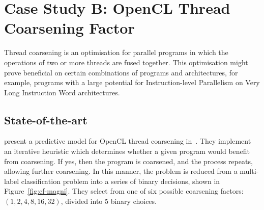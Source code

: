 \section{Case Study B: OpenCL Thread Coarsening Factor}
\label{sec:deeptune-case-study-b}

Thread coarsening is an optimisation for parallel programs in which the operations of two or more threads are fused together. This optimisation might prove beneficial on certain combinations of programs and architectures, for example, programs with a large potential for Instruction-level Parallelism on Very Long Instruction Word architectures.

\subsection{State-of-the-art} \citeauthor{Magni2014} present a predictive model for OpenCL thread coarsening in~\cite{Magni2014}. They implement an iterative heuristic which determines whether a given program would benefit from coarsening. If yes, then the program is coarsened, and the process repeats, allowing further coarsening. In this manner, the problem is reduced from a multi-label classification problem into a series of binary decisions, shown in Figure~\ref{fig:cf-magni}. They select from one of six possible coarsening factors: $(1, 2, 4, 8, 16, 32)$, divided into 5 binary choices.

